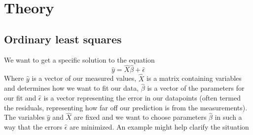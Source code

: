 \newcommand{\colVec}[1]{\begin{bmatrix} #1_0 \\ #1_1 \\ \vdots \\ #1_{n-1} \\ #1_{n} \end{bmatrix}}

\section{Theory}
\subsection{Ordinary least squares}
We want to get a specific solution to the equation
\begin{equation}\label{eq: linearFit} \hat{y} = \hat{X}\hat{\beta}+\hat{\epsilon} \end{equation}
Where $\hat{y}$ is a vector of our measured values, $\hat{X}$ is a matrix containing variables and determines how we want to fit our data, $\hat{\beta}$ is a vector of the parameters for our fit and $\hat{\epsilon}$ is a vector representing the error in our datapoints (often termed the residuals, representing how far off our prediction is from the measurements). The variables $\hat{y}$ and $\hat{X}$ are fixed and we want to choose parameters $\hat{\beta}$ in such a way that the errors $\hat{\epsilon}$ are minimized. An example might help clarify the situation\\\\

